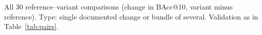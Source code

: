\documentclass{article}
\begin{document}
\begin{landscape}
\begin{table}
  \caption{All 30 reference--variant comparisons (change in BAcc@10, variant minus reference). Type: single documented change or bundle of several. Validation as in Table~\ref{tab:pairs}.}
  \label{tab:allpairs}
  \centering
  \setlength{\tabcolsep}{3pt}
  
\end{table}
\end{landscape}
\end{document}
